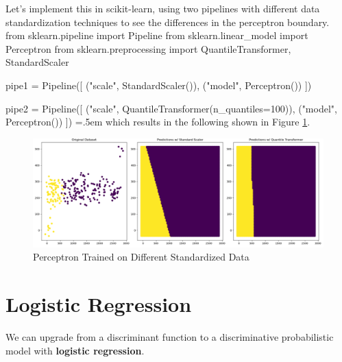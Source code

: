 \documentclass{article}
\theoremstyle{definition}
\newenvironment{cverbatim}
    {\SaveVerbatim{cverb}}
    {\endSaveVerbatim
    \flushleft\fboxrule=0pt\fboxsep=.5em
    \colorbox{cverbbg}{%
      \makebox[\dimexpr\linewidth-2\fboxsep][l]{\BUseVerbatim{cverb}}%
    }
    \endflushleft
  }
\begin{document}
  Let's implement this in scikit-learn, using two pipelines with different data standardization techniques to see the differences in the perceptron boundary. 
  \begin{cverbatim}
  from sklearn.pipeline import Pipeline 
  from sklearn.linear_model import Perceptron
  from sklearn.preprocessing import QuantileTransformer, StandardScaler

  pipe1 = Pipeline([ 
      ("scale", StandardScaler()), 
      ("model", Perceptron())
  ])

  pipe2 = Pipeline([
      ("scale", QuantileTransformer(n_quantiles=100)), 
      ("model", Perceptron())
  ])
  \end{cverbatim}
  which results in the following shown in Figure \ref{fig:Percepton_on_Standardized_data}. 
  \begin{figure}[hbt!]
      \centering
      \includegraphics[scale=0.4]{Section_3/Perceptron.png}
      \caption{Perceptron Trained on Different Standardized Data}
      \label{fig:Percepton_on_Standardized_data}
  \end{figure}

\section{Logistic Regression}

  We can upgrade from a discriminant function to a discriminative probabilistic model with \textbf{logistic regression}. 
\end{document}
